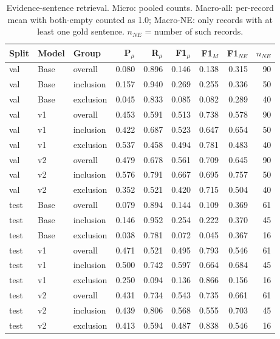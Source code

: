 \begin{table}[t]
\centering
\caption{Evidence-sentence retrieval. Micro: pooled counts. Macro-all: per-record mean with both-empty counted as 1.0; Macro-NE: only records with at least one gold sentence. $n_{NE}$ = number of such records.}
\label{tab:evidence}
\scriptsize
\setlength{\tabcolsep}{3pt}
\begin{tabular}{lllrrrrrr}
\toprule
Split & Model & Group & P$_\mu$ & R$_\mu$ & F1$_\mu$ & F1$_{M}$ & F1$_{NE}$ & $n_{NE}$ \\
\midrule
val & Base & overall & 0.080 & 0.896 & 0.146 & 0.138 & 0.315 & 90 \\
val & Base & inclusion & 0.157 & 0.940 & 0.269 & 0.255 & 0.336 & 50 \\
val & Base & exclusion & 0.045 & 0.833 & 0.085 & 0.082 & 0.289 & 40 \\
val & v1 & overall & 0.453 & 0.591 & 0.513 & 0.738 & 0.578 & 90 \\
val & v1 & inclusion & 0.422 & 0.687 & 0.523 & 0.647 & 0.654 & 50 \\
val & v1 & exclusion & 0.537 & 0.458 & 0.494 & 0.781 & 0.483 & 40 \\
val & v2 & overall & 0.479 & 0.678 & 0.561 & 0.709 & 0.645 & 90 \\
val & v2 & inclusion & 0.576 & 0.791 & 0.667 & 0.695 & 0.757 & 50 \\
val & v2 & exclusion & 0.352 & 0.521 & 0.420 & 0.715 & 0.504 & 40 \\
test & Base & overall & 0.079 & 0.894 & 0.144 & 0.109 & 0.369 & 61 \\
test & Base & inclusion & 0.146 & 0.952 & 0.254 & 0.222 & 0.370 & 45 \\
test & Base & exclusion & 0.038 & 0.781 & 0.072 & 0.045 & 0.367 & 16 \\
test & v1 & overall & 0.471 & 0.521 & 0.495 & 0.793 & 0.546 & 61 \\
test & v1 & inclusion & 0.500 & 0.742 & 0.597 & 0.664 & 0.684 & 45 \\
test & v1 & exclusion & 0.250 & 0.094 & 0.136 & 0.866 & 0.156 & 16 \\
test & v2 & overall & 0.431 & 0.734 & 0.543 & 0.735 & 0.661 & 61 \\
test & v2 & inclusion & 0.439 & 0.806 & 0.568 & 0.555 & 0.703 & 45 \\
test & v2 & exclusion & 0.413 & 0.594 & 0.487 & 0.838 & 0.546 & 16 \\
\bottomrule
\end{tabular}
\end{table}
